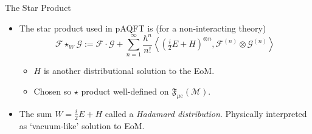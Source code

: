\documentclass[pdf, fleqn, compress, handout]{beamer}
\newcommand{\mathsterm}[1]{{\itshape\color{dark-teal!80}#1}}
\begin{document}
\begin{frame}{The Star Product}
	\begin{itemize}
		\item	The star product used in pAQFT is (for a non-interacting theory)
				\begin{equation}
					\mathcal{F} \star_W
					\mathcal{G}
						:=
					\mathcal{F} \cdot
					\mathcal{G}
						+
					\sum_{n = 1}^\infty
					\frac{\hbar^n}{n!}
					\left\langle 
						\!\left( \tfrac{i}{2} E + H \right)^{\otimes n},
						\mathcal{F}^{(n)} \otimes
						\mathcal{G}^{(n)}
					\right\rangle
				\end{equation}
				\begin{itemize}
					\item	$H$ is another distributional solution to the EoM.
					\item	Chosen so $\star$ product well-defined on
							$\mathfrak{F}_{\mu \mathrm{c}}(\mathcal{M})$.
				\end{itemize}
		\item	The sum $W = \tfrac{i}{2} E + H$ called a \mathsterm{Hadamard distribution}.
				Physically interpreted as `vacuum-like' solution to EoM.
	\end{itemize}
\end{frame}
\end{document}
